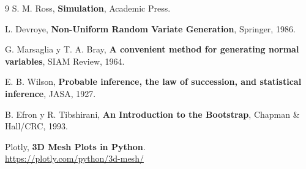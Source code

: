 \documentclass[11pt,a4paper]{article}
\begin{document}
\begin{thebibliography}{9}
S. M. Ross, \textbf{Simulation}, Academic Press.

L. Devroye, \textbf{Non-Uniform Random Variate Generation}, Springer, 1986.

G. Marsaglia y T. A. Bray, \textbf{A convenient method for generating normal
variables}, SIAM Review, 1964.

E. B. Wilson, \textbf{Probable inference, the law of succession, and
statistical inference}, JASA, 1927.

B. Efron y R. Tibshirani, \textbf{An Introduction to the Bootstrap},
Chapman \& Hall/CRC, 1993.

Plotly, \textbf{3D Mesh Plots in Python}.\\
\url{https://plotly.com/python/3d-mesh/}
\end{thebibliography}
\end{document}
